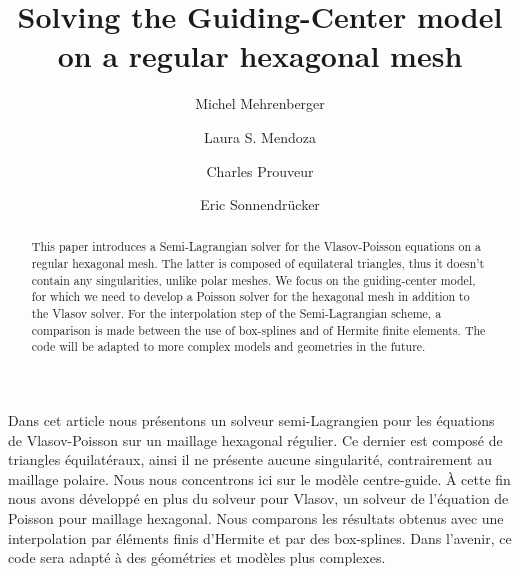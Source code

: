 \documentclass[proc]{edpsmath}
\begin{document}

\title{Solving the Guiding-Center model\\on a regular hexagonal mesh}%
%
\author{Michel Mehrenberger} \address{IRMA, Universit\'e de Strasbourg, 7, rue Ren\'e Descartes, 67084 Strasbourg \& INRIA-Nancy Grand-Est, projet TONUS, 
}
\author{Laura S. Mendoza} \address{Max-Planck-Institut f\"{u}r Plasmaphysik, Boltzmannstr. 2, D-85748 Garching, Germany. } 
\author{Charles Prouveur}\address{Universit\'e de Lyon, UMR5208, Institut Camille Jordan,
43 boulevard 11 novembre 1918, F-69622 Villeurbanne cedex, France.  }
\author{Eric Sonnendr\"{u}cker}
%
%


\begin{abstract} 
This paper introduces a Semi-Lagrangian solver for the Vlasov-Poisson equations on a regular hexagonal mesh. The latter is composed of equilateral triangles, thus it doesn't contain any singularities, unlike polar meshes. We focus on the guiding-center model, for which we need to develop  a Poisson solver for the hexagonal mesh in addition to the Vlasov solver. For the interpolation step of the Semi-Lagrangian scheme, a comparison is made between the use of box-splines and of Hermite finite elements. The code will be adapted  to more complex models and geometries in the future.
\end{abstract}

\begin{resume} 
Dans cet article nous pr\'esentons un solveur semi-Lagrangien pour les \'equations de Vlasov-Poisson sur un maillage hexagonal r\'egulier. Ce dernier est compos\'e de triangles \'equilat\'eraux, ainsi il ne pr\'esente aucune singularit\'e, contrairement au maillage polaire. Nous nous concentrons ici sur le mod\`ele centre-guide. \`A cette fin nous avons d\'evelopp\'e en plus du solveur pour Vlasov, un solveur de l'\'equation de Poisson pour maillage hexagonal. Nous comparons les r\'esultats obtenus avec une interpolation par  \'el\'ements finis d'Hermite et par des box-splines.   Dans l'avenir, ce code sera adapt\'e \`a des g\'eom\'etries et mod\`eles plus complexes.  
\end{resume}
\end{document}
